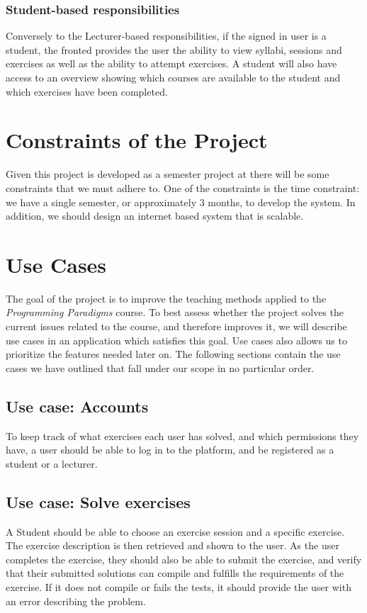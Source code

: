 \subsubsection*{Student-based responsibilities}
Conversely to the Lecturer-based responsibilities, if the signed in user is a student, the fronted provides the user the ability to view syllabi, sessions and exercises as well as the ability to attempt exercises. A student will also have access to an overview showing which courses are available to the student and which exercises have been completed.


\section*{Constraints of the Project}
Given this project is developed as a semester project at \aau{} there will be some constraints that we must adhere to.
One of the constraints is the time constraint: we have a single semester, or approximately 3 months, to develop the system.
In addition, we should design an internet based system that is scalable. 

\section*{Use Cases} \label{sec:use_cases}
The goal of the project is to improve the teaching methods applied to the \textit{Programming Paradigms} course.
To best assess whether the project solves the current issues related to the course, and therefore improves it, we will describe use cases in an application which satisfies this goal.
Use cases also allows us to prioritize the features needed later on.
The following sections contain the use cases we have outlined that fall under our scope in no particular order.

\subsection*{Use case: Accounts}
To keep track of what exercises each user has solved, and which permissions they have, a user should be able to log in to the platform, and be registered as a student or a lecturer.

\subsection*{Use case: Solve exercises}
A Student should be able to choose an exercise session and a specific exercise. The exercise description is then retrieved and shown to the user.
As the user completes the exercise, they should also be able to submit the exercise, and verify that their submitted solutions can compile and fulfills the requirements of the exercise. If it does not compile or fails the tests, it should provide the user with an error describing the problem.

